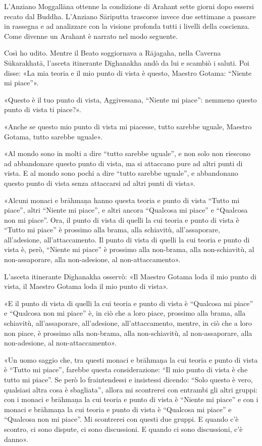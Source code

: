  L’Anziano Moggallāna ottenne la condizione di
Arahant sette giorni dopo essersi recato dal Buddha. L’Anziano Sāriputta
trascorse invece due settimane a passare in rassegna e ad analizzare con la
visione profonda tutti i livelli della coscienza. Come divenne un Arahant è
narrato nel modo seguente.

 Così ho udito. Mentre il Beato soggiornava a Rājagaha, nella
Caverna Sūkarakhatā, l’asceta itinerante Dīghanakha andò da lui e scambiò i
saluti. Poi disse: «La mia teoria e il mio punto di vista è questo, Maestro
Gotama: “Niente mi piace”».

«Questo è il tuo punto di vista, Aggivessana, “Niente mi piace”: nemmeno questo
punto di vista ti piace?».

«Anche se questo mio punto di vista mi piacesse, tutto sarebbe uguale, Maestro
Gotama, tutto sarebbe uguale».

«Al mondo sono in molti a dire “tutto sarebbe uguale”, e non solo non riescono
ad abbandonare questo punto di vista, ma si attaccano pure ad altri punti di
vista. E al mondo sono pochi a dire “tutto sarebbe uguale”, e abbandonano questo
punto di vista senza attaccarsi ad altri punti di vista».

«Alcuni monaci e brāhmaṇa hanno questa teoria e punto di vista “Tutto mi piace”,
altri “Niente mi piace”, e altri ancora “Qualcosa mi piace” e “Qualcosa non mi
piace”. Ora, il punto di vista di quelli la cui teoria e punto di vista è “Tutto
mi piace” è prossimo alla brama, alla schiavitù, all’assaporare, all’adesione,
all’attaccamento. Il punto di vista di quelli la cui teoria e punto di vista è,
però, “Niente mi piace” è prossimo alla non-brama, alla non-schiavitù, al
non-assaporare, alla non-adesione, al non-attaccamento».

L’asceta itinerante Dīghanakha osservò: «Il Maestro Gotama loda il mio punto di
vista, il Maestro Gotama loda il mio punto di vista».

«E il punto di vista di quelli la cui teoria e punto di vista è “Qualcosa mi
piace” e “Qualcosa non mi piace” è, in ciò che a loro piace, prossimo alla
brama, alla schiavitù, all’assaporare, all’adesione, all’attaccamento, mentre,
in ciò che a loro non piace, è prossimo alla non-brama, alla non-schiavitù, al
non-assaporare, alla non-adesione, al non-attaccamento».

«Un uomo saggio che, tra questi monaci e brāhmaṇa la cui teoria e punto di vista
è “Tutto mi piace”, farebbe questa considerazione: “Il mio punto di vista è che
tutto mi piace”. Se però lo fraintendessi e insistessi dicendo: “Solo questo è
vero, qualsiasi altra cosa è sbagliata”, allora mi scontrerei con entrambi gli
altri gruppi: con i monaci e brāhmaṇa la cui teoria e punto di vista è “Niente
mi piace” e con i monaci e brāhmaṇa la cui teoria e punto di vista è “Qualcosa
mi piace” e “Qualcosa non mi piace”. Mi scontrerei con questi due gruppi. E
quando c’è scontro, ci sono dispute, ci sono discussioni. E quando ci sono
discussioni, c’è danno».

